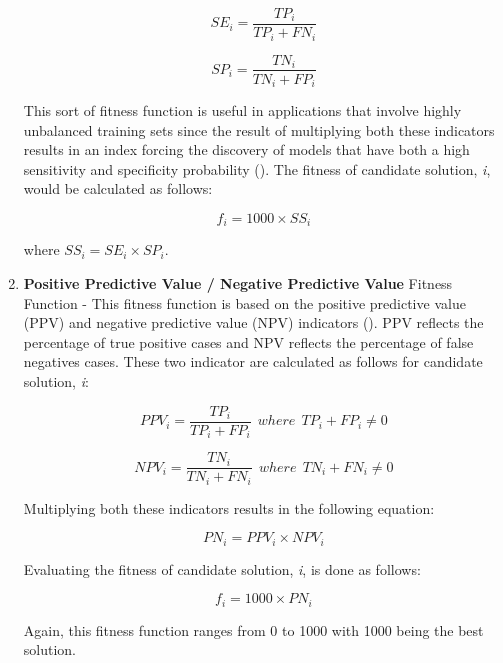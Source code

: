\begin{enumerate}
    \begin{equation}\label{alg:sensitivity}
        SE_i = \frac{TP_i}{TP_i + FN_i}
    \end{equation}

    \begin{equation}\label{alg:specificity}
        SP_i = \frac{TN_i}{TN_i + FP_i}
    \end{equation}

    \noindent This sort of fitness function is useful in applications that involve highly unbalanced training sets since the result of multiplying both these indicators results in an index forcing the discovery of models that have both a high sensitivity and specificity probability (\cite{ferreira2006gene}). The fitness of candidate solution, \textit{i}, would be calculated as follows:

    \begin{equation}\label{alg:ss_fitness}
        f_i = 1000 \times SS_i
    \end{equation}

    \noindent where $SS_i = SE_i \times SP_i$.

    \item \textbf{Positive Predictive Value / Negative Predictive Value} Fitness Function - This fitness function is based on the positive predictive value (PPV) and negative predictive value (NPV) indicators (\cite{ferreira2006gene}). PPV reflects the percentage of true positive cases and NPV reflects the percentage of false negatives cases. These two indicator are calculated as follows for candidate solution, \textit{i}:
    
    \begin{equation}\label{alg:ppv}
        PPV_i = \frac{TP_i}{TP_i + FP_i}\:\:where \:\: TP_i + FP_i \neq 0
    \end{equation}

    \begin{equation}\label{alg:npv}
        NPV_i = \frac{TN_i}{TN_i + FN_i}\:\:where \:\: TN_i + FN_i \neq 0
    \end{equation}

    \noindent Multiplying both these indicators results in the following equation:

    \begin{equation}\label{alg:ppv_npv}
        PN_i = PPV_i \times NPV_i
    \end{equation}

    \noindent Evaluating the fitness of candidate solution, \textit{i}, is done as follows:

    \begin{equation}\label{alg:ppv_fitness}
        f_i = 1000 \times PN_i
    \end{equation}

    \noindent Again, this fitness function ranges from 0 to 1000 with 1000 being the best solution.
\end{enumerate}

